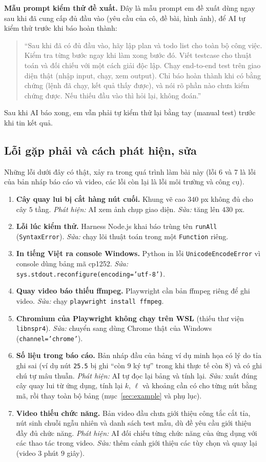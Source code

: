 \documentclass[12pt,a4paper]{article}
\begin{document}
\textbf{Mẫu prompt kiểm thử đề xuất.} Đây là mẫu prompt em đề xuất dùng ngay sau khi đã cung cấp đủ đầu vào (yêu cầu của cô, đề bài, hình ảnh), để AI tự kiểm thử trước khi báo hoàn thành:
\begin{quote}
``Sau khi đã có đủ đầu vào, hãy lập plan và todo list cho toàn bộ công việc. Kiểm tra từng bước ngay khi làm xong bước đó. Viết testcase cho thuật toán và đối chiếu với một cách giải độc lập. Chạy end-to-end test trên giao diện thật (nhập input, chạy, xem output). Chỉ báo hoàn thành khi có bằng chứng (lệnh đã chạy, kết quả thấy được), và nói rõ phần nào chưa kiểm chứng được. Nếu thiếu đầu vào thì hỏi lại, không đoán.''
\end{quote}
Sau khi AI báo xong, em vẫn phải tự kiểm thử lại bằng tay (manual test) trước khi tin kết quả.

\subsection{Lỗi gặp phải và cách phát hiện, sửa}
Những lỗi dưới đây có thật, xảy ra trong quá trình làm bài này (lỗi 6 và 7 là lỗi của bản nháp báo cáo và video, các lỗi còn lại là lỗi môi trường và công cụ).
\begin{enumerate}
    \item \textbf{Cây quay lui bị cắt hàng nút cuối.} Khung vẽ cao $340$ px không đủ cho cây $5$ tầng. \emph{Phát hiện:} AI xem ảnh chụp giao diện. \emph{Sửa:} tăng lên $430$ px.
    \item \textbf{Lỗi lúc kiểm thử.} Harness Node.js khai báo trùng tên \texttt{runAll} (\texttt{SyntaxError}). \emph{Sửa:} chạy lõi thuật toán trong một \texttt{Function} riêng.
    \item \textbf{In tiếng Việt ra console Windows.} Python in lỗi \texttt{UnicodeEncodeError} vì console dùng bảng mã cp1252. \emph{Sửa:} \texttt{sys.stdout.reconfigure(encoding='utf-8')}.
    \item \textbf{Quay video báo thiếu ffmpeg.} Playwright cần bản ffmpeg riêng để ghi video. \emph{Sửa:} chạy \texttt{playwright install ffmpeg}.
    \item \textbf{Chromium của Playwright không chạy trên WSL} (thiếu thư viện \texttt{libnspr4}). \emph{Sửa:} chuyển sang dùng Chrome thật của Windows (\texttt{channel='chrome'}).
    \item \textbf{Số liệu trong báo cáo.} Bản nháp đầu của bảng ví dụ minh họa có lý do tỉa ghi sai (ví dụ nút \texttt{25.5} bị ghi ``còn $9$ ký tự'' trong khi thực tế còn $8$) và có ghi chú tự mâu thuẫn. \emph{Phát hiện:} AI tự đọc lại bảng và tính lại. \emph{Sửa:} xuất đúng cây quay lui từ ứng dụng, tính lại $k$, $\ell$ và khoảng cần có cho từng nút bằng mã, rồi thay toàn bộ bảng (mục~\ref{sec:example} và phụ lục).
    \item \textbf{Video thiếu chức năng.} Bản video đầu chưa giới thiệu công tắc cắt tỉa, nút sinh chuỗi ngẫu nhiên và danh sách test mẫu, dù đề yêu cầu giới thiệu đầy đủ chức năng. \emph{Phát hiện:} AI đối chiếu từng chức năng của ứng dụng với các thao tác trong video. \emph{Sửa:} thêm cảnh giới thiệu các tùy chọn và quay lại (video $3$ phút $9$ giây).
\end{enumerate}
\end{document}
